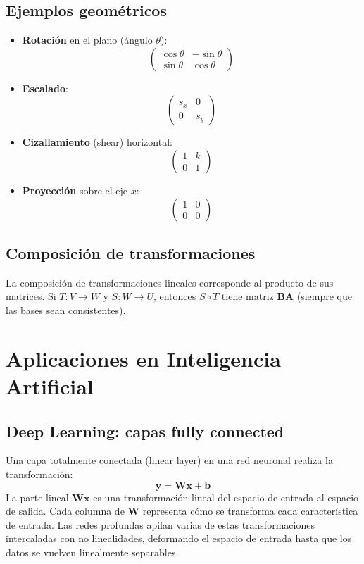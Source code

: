 \documentclass[12pt,a4paper,openany,oneside]{book}
\begin{document}
\subsection{Ejemplos geométricos}
\begin{itemize}
    \item \textbf{Rotación} en el plano (ángulo $\theta$):
    \[
    \begin{pmatrix} \cos\theta & -\sin\theta \\ \sin\theta & \cos\theta \end{pmatrix}
    \]
    \item \textbf{Escalado}:
    \[
    \begin{pmatrix} s_x & 0 \\ 0 & s_y \end{pmatrix}
    \]
    \item \textbf{Cizallamiento} (shear) horizontal:
    \[
    \begin{pmatrix} 1 & k \\ 0 & 1 \end{pmatrix}
    \]
    \item \textbf{Proyección} sobre el eje $x$:
    \[
    \begin{pmatrix} 1 & 0 \\ 0 & 0 \end{pmatrix}
    \]
\end{itemize}

\subsection{Composición de transformaciones}
La composición de transformaciones lineales corresponde al producto de sus matrices. Si $T: V \to W$ y $S: W \to U$, entonces $S \circ T$ tiene matriz $\mathbf{B}\mathbf{A}$ (siempre que las bases sean consistentes).

\section{Aplicaciones en Inteligencia Artificial}

\subsection{Deep Learning: capas fully connected}
Una capa totalmente conectada (linear layer) en una red neuronal realiza la transformación:
\[
\mathbf{y} = \mathbf{W}\mathbf{x} + \mathbf{b}
\]
La parte lineal $\mathbf{W}\mathbf{x}$ es una transformación lineal del espacio de entrada al espacio de salida. Cada columna de $\mathbf{W}$ representa cómo se transforma cada característica de entrada. Las redes profundas apilan varias de estas transformaciones intercaladas con no linealidades, deformando el espacio de entrada hasta que los datos se vuelven linealmente separables.
\end{document}
